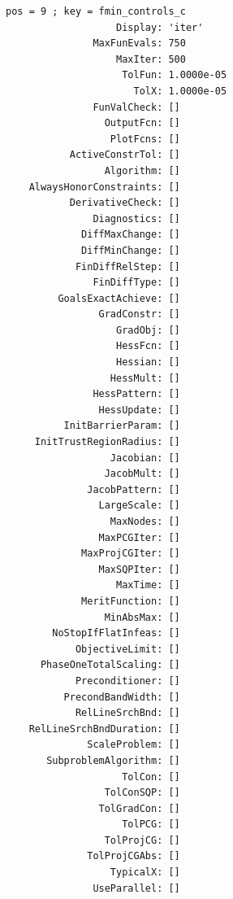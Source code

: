 \documentclass[
]{book}
\begin{document}
\begin{verbatim}
pos = 9 ; key = fmin_controls_c
                   Display: 'iter'
               MaxFunEvals: 750
                   MaxIter: 500
                    TolFun: 1.0000e-05
                      TolX: 1.0000e-05
               FunValCheck: []
                 OutputFcn: []
                  PlotFcns: []
           ActiveConstrTol: []
                 Algorithm: []
    AlwaysHonorConstraints: []
           DerivativeCheck: []
               Diagnostics: []
             DiffMaxChange: []
             DiffMinChange: []
            FinDiffRelStep: []
               FinDiffType: []
         GoalsExactAchieve: []
                GradConstr: []
                   GradObj: []
                   HessFcn: []
                   Hessian: []
                  HessMult: []
               HessPattern: []
                HessUpdate: []
          InitBarrierParam: []
     InitTrustRegionRadius: []
                  Jacobian: []
                 JacobMult: []
              JacobPattern: []
                LargeScale: []
                  MaxNodes: []
                MaxPCGIter: []
             MaxProjCGIter: []
                MaxSQPIter: []
                   MaxTime: []
             MeritFunction: []
                 MinAbsMax: []
        NoStopIfFlatInfeas: []
            ObjectiveLimit: []
      PhaseOneTotalScaling: []
            Preconditioner: []
          PrecondBandWidth: []
            RelLineSrchBnd: []
    RelLineSrchBndDuration: []
              ScaleProblem: []
       SubproblemAlgorithm: []
                    TolCon: []
                 TolConSQP: []
                TolGradCon: []
                    TolPCG: []
                 TolProjCG: []
              TolProjCGAbs: []
                  TypicalX: []
               UseParallel: []


\end{verbatim}
\end{document}

